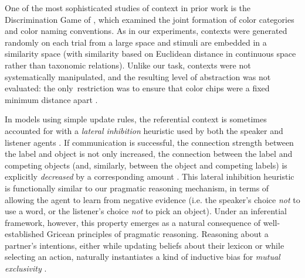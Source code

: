 One of the most sophisticated studies of context in prior work is the Discrimination Game of , which examined the joint formation of color categories and color naming conventions.
As in our experiments, contexts were generated randomly on each trial from a large space and stimuli are embedded in a similarity space (with similarity based on Euclidean distance in continuous space rather than taxonomic relations).
Unlike our task, contexts were not systematically manipulated, and the resulting level of abstraction was not evaluated: the only restriction was to ensure that color chips were a fixed minimum distance apart  \cite<see also>[which found that imposing a realistic Just Noticeable Difference function as the minimum distance on communicative contexts leads to human-like color naming systems]{baronchelli2010modeling}. 

In models using simple update rules, the referential context is sometimes accounted for with a \emph{lateral inhibition} heuristic used by both the speaker and listener agents \cite{franke2012bidirectional}.
If communication is successful, the connection strength between the label and object is not only increased, the connection between the label and competing objects (and, similarly, between the object and competing labels) is explicitly \emph{decreased} by a corresponding amount \cite<see also>{steels2005coordinating}.
This lateral inhibition heuristic is functionally similar to our pragmatic reasoning mechanism, in terms of allowing the agent to learn from negative evidence (i.e. the speaker's choice \emph{not} to use a word, or the listener's choice \emph{not} to pick an object). 
Under an inferential framework, however, this property emerges as a natural consequence of well-established Gricean principles of pragmatic reasoning.
Reasoning about a partner's intentions, either while updating beliefs about their lexicon or while selecting an action, naturally instantiates a kind of inductive bias for \emph{mutual exclusivity} \cite{gulordava2020one,ohmerreinforcement,FrankGoodmanTenenbaum09_Wurwur}.

